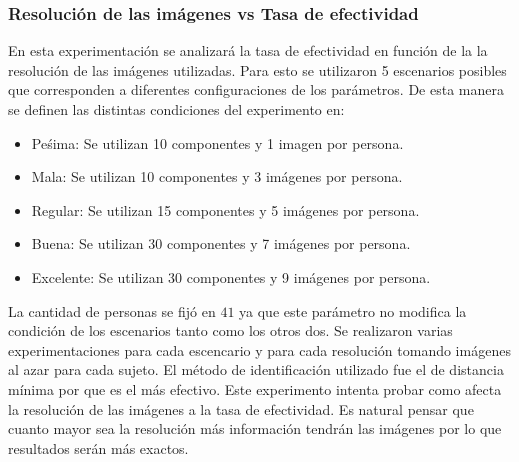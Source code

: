\subsubsection{Resolución de las imágenes vs Tasa de efectividad}
En esta experimentación se analizará la tasa de efectividad en función de la la resolución de las imágenes utilizadas. Para esto se utilizaron 5 escenarios posibles que corresponden a diferentes configuraciones de los parámetros. De esta manera se definen las distintas condiciones del experimento en:
\begin{itemize}
\item Peśima: Se utilizan 10 componentes y 1 imagen por persona.
\item Mala: Se utilizan 10 componentes y 3 imágenes por persona.
\item Regular: Se utilizan 15 componentes y 5 imágenes por persona.
\item Buena: Se utilizan 30 componentes y 7 imágenes por persona.
\item Excelente: Se utilizan 30 componentes y 9 imágenes por persona.
\end{itemize}
La cantidad de personas se fijó en $41$ ya que este parámetro no modifica la condición de los escenarios tanto como los otros dos. Se realizaron varias experimentaciones para cada escencario y para cada resolución tomando imágenes al azar para cada sujeto. El método de identificación utilizado fue el de distancia mínima por que es el más efectivo. Este experimento intenta probar como afecta la resolución de las imágenes a la tasa de efectividad. Es natural pensar que cuanto mayor sea la resolución más información tendrán las imágenes por lo que resultados serán más exactos.
